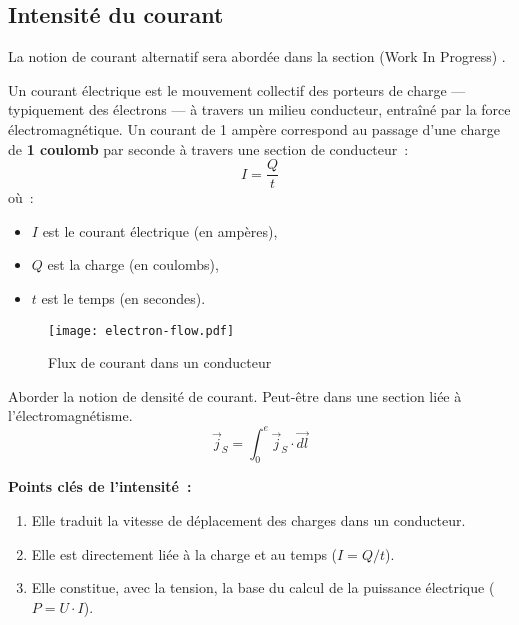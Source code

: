 \subsection{Intensit\'e du courant} \label{subsec:current}
\begin{Note}
	La notion de courant alternatif sera abord\'ee dans la section (Work In Progress) .
\end{Note}
Un courant \'electrique est le mouvement collectif des porteurs de charge — typiquement des \'electrons — à travers un milieu conducteur, entraîn\'e par la force \'electromagn\'etique. Un courant de 1 amp\`ere correspond au passage d'une charge de \textbf{1 coulomb} par seconde à travers une section de conducteur~:
\[
  I = \frac{Q}{t}
\]
où~:
\begin{itemize}
  \item \(I\) est le courant \'electrique (en amp\`eres),
  \item \(Q\) est la charge (en coulombs),
  \item \(t\) est le temps (en secondes).
\end{itemize}
\begin{figure}[H]
    \texttt{[image: electron-flow.pdf]}
    \caption{Flux de courant dans un conducteur}
\end{figure}
\begin{Todo}
	Aborder la notion de densit\'e de courant. Peut-\^etre dans une section li\'ee \`a l'\'electromagn\'etisme.
	\[
	\vec{j}_S=\int_0^e\vec{j}_S\cdot\vec{dl}
	\]
\end{Todo}
\begin{Note}
\vspace{\baselineskip}
\textbf{Points cl\'es de l'intensit\'e~:}
\begin{enumerate}
  \item Elle traduit la vitesse de d\'eplacement des charges dans un conducteur.
  \item Elle est directement li\'ee à la charge et au temps (\(I = Q/t\)).
  \item Elle constitue, avec la tension, la base du calcul de la puissance \'electrique (\(P = U \cdot I\)).
\end{enumerate}
\end{Note}

